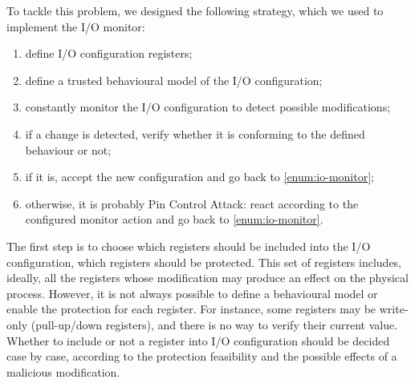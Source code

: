 To tackle this problem, we designed the following strategy, which we used to implement the I/O monitor:
\begin{enumerate}
	\item define I/O configuration registers;
	\item define a trusted behavioural model of the I/O configuration;
	\item \label{enum:io-monitor} constantly monitor the I/O configuration to detect possible modifications;
	\item if a change is detected, verify whether it is conforming to the defined behaviour or not;
	\item if it is, accept the new configuration and go back to \ref{enum:io-monitor};
	\item otherwise, it is probably Pin Control Attack: react according to the configured monitor action and go back to \ref{enum:io-monitor}.
\end{enumerate}
The first step is to choose which registers should be included into the I/O configuration, \ie which registers should be protected.
This set of registers includes, ideally, all the registers whose modification may produce an effect on the physical process.
However, it is not always possible to define a behavioural model or enable the protection for each register. For instance,
some registers may be write-only (\eg pull-up/down registers), and there is no way to verify their current value.
Whether to include or not a register into I/O configuration should be decided case by case,
according to the protection feasibility and the possible effects of a malicious modification.

